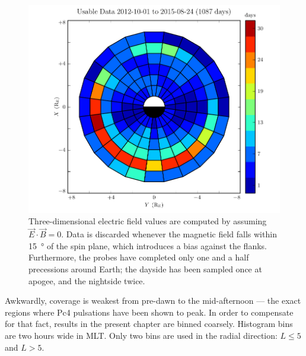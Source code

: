 
\begin{figure}[!htb]
    \centering
    \includegraphics[width=\textwidth]{figures/pos_all_sharp.pdf}
    \caption[Distribution of Usable Van Allen Probe Data: Fine Resolution]{
      Three-dimensional electric field values are computed by assuming $\vec{E} \cdot \vec{B} = 0$. Data is discarded whenever the magnetic field falls within \SI{15}{\degree} of the spin plane, which introduces a bias against the flanks. Furthermore, the probes have completed only one and a half precessions around Earth; the dayside has been sampled once at apogee, and the nightside twice. 
    }
    \label{fig_pos_all_sharp}
\end{figure}

Awkwardly, coverage is weakest from pre-dawn to the mid-afternoon --- the exact regions where Pc4 pulsations have been shown to peak. In order to compensate for that fact, results in the present chapter are binned coarsely. Histogram bins are two hours wide in MLT. Only two bins are used in the radial direction: $L \leq 5$ and $L > 5$. 


